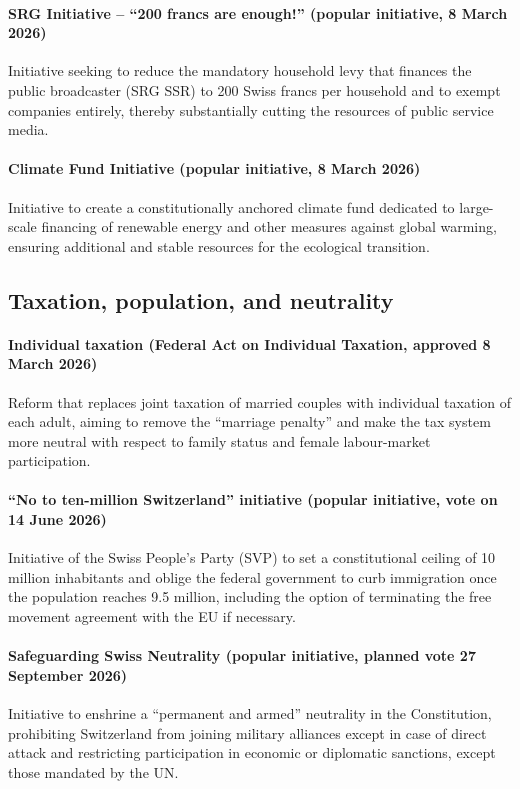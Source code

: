 \documentclass[11pt]{article}
\begin{document}
\paragraph{SRG Initiative -- ``200 francs are enough!'' (popular initiative, 8 March 2026)}
Initiative seeking to reduce the mandatory household levy that finances the public broadcaster (SRG SSR) to 200 Swiss francs per household and to exempt companies entirely, thereby substantially cutting the resources of public service media.

\paragraph{Climate Fund Initiative (popular initiative, 8 March 2026)}
Initiative to create a constitutionally anchored climate fund dedicated to large-scale financing of renewable energy and other measures against global warming, ensuring additional and stable resources for the ecological transition.

\subsection*{Taxation, population, and neutrality}

\paragraph{Individual taxation (Federal Act on Individual Taxation, approved 8 March 2026)}
Reform that replaces joint taxation of married couples with individual taxation of each adult, aiming to remove the ``marriage penalty'' and make the tax system more neutral with respect to family status and female labour-market participation.

\paragraph{``No to ten-million Switzerland'' initiative (popular initiative, vote on 14 June 2026)}
Initiative of the Swiss People’s Party (SVP) to set a constitutional ceiling of 10 million inhabitants and oblige the federal government to curb immigration once the population reaches 9.5 million, including the option of terminating the free movement agreement with the EU if necessary.

\paragraph{Safeguarding Swiss Neutrality (popular initiative, planned vote 27 September 2026)}
Initiative to enshrine a ``permanent and armed'' neutrality in the Constitution, prohibiting Switzerland from joining military alliances except in case of direct attack and restricting participation in economic or diplomatic sanctions, except those mandated by the UN.
\end{document}
